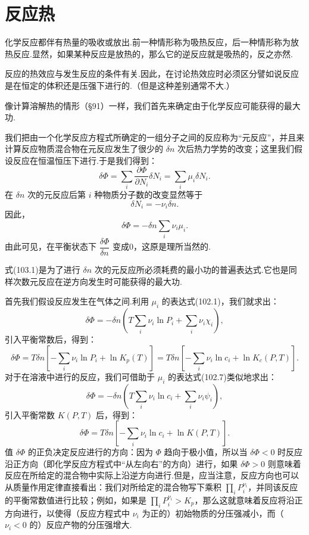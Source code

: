 \section{反应热}

化学反应都伴有热量的吸收或放出.前一种情形称为吸热反应，后一种情形称为放热反应.显然，如果某种反应是放热的，那么它的逆反应就是吸热的，反之亦然.

反应的热效应与发生反应的条件有关.因此，在讨论热效应时必须区分譬如说反应是在恒定的体积还是压强下进行的.（但是这种差别通常不大.）

像计算溶解热的情形（§91）一样，我们首先来确定由于化学反应可能获得的最大功.

我们把由一个化学反应方程式所确定的一组分子之间的反应称为“元反应”，并且来计算反应物质混合物在元反应发生了很少的 $\delta n$ 次后热力学势的改变；这里我们假设反应在恒温恒压下进行.于是我们得到：
\begin{equation*}
  \delta\Phi=\sum_i\frac{\partial\Phi}{\partial N_i}\delta N_i
  =\sum_i\mu_i\delta N_i.
\end{equation*}
在 $\delta n$ 次的元反应后第 $i$ 种物质分子数的改变显然等于
\begin{equation*}
  \delta N_i=-\nu_i\delta n.
\end{equation*}
因此，
\begin{equation}
  \delta\Phi=-\delta n\sum_i\nu_i\mu_i.
\end{equation}
由此可见，在平衡状态下 $\dfrac{\delta\Phi}{\delta n}$ 变成0，这原是理所当然的.

式(103.1)是为了进行 $\delta n$ 次的元反应所必须耗费的最小功的普遍表达式.它也是同样次数元反应在逆方向发生时可能获得的最大功.

首先我们假设反应发生在气体之间.利用 $\mu_i$ 的表达式(102.1)，我们就求出：
\begin{equation*}
  \delta\Phi=-\delta n\left(T\sum_i\nu_i\ln P_i
  +\sum_i\nu_i\chi_i\right),
\end{equation*}
引入平衡常数后，得到：
\begin{equation}
  \delta\Phi=T\delta n\left[-\sum_i\nu_i\ln P_i+\ln K_p(T)\right]
  =T\delta n\left[-\sum_i\nu_i\ln c_i+\ln K_c(P,T)\right].
\end{equation}
对于在溶液中进行的反应，我们可借助于 $\mu_i$ 的表达式(102.7)类似地求出：
\begin{equation*}
  \delta\Phi=-\delta n\left(T\sum_i\nu_i\ln c_i
  +\sum_i\nu_i\psi_i\right),
\end{equation*}
引入平衡常数 $K(P,T)$ 后，得到：
\begin{equation}
  \delta\Phi=T\delta n\left[-\sum_i\nu_i\ln c_i
  +\ln K(P,T)\right].
\end{equation}
值 $\delta\Phi$ 的正负决定反应进行的方向：因为 $\Phi$ 趋向于极小值，所以当 $\delta\Phi<0$ 时反应沿正方向（即化学反应方程式中“从左向右”的方向）进行，如果 $\delta\Phi>0$ 则意味着反应在所给定的混合物中实际上沿逆方向进行.但是，应当注意，反应方向也可以从质量作用定律直接看出：我们对所给定的混合物写下乘积 $\prod\limits_iP_i^{\nu_i}$，并同该反应的平衡常数值进行比较；例如，如果是 $\prod\limits_iP_i^{\nu_i}>K_p$，那么这就意味着反应将沿正方向进行，以使得（反应方程式中 $\nu_i$ 为正的）初始物质的分压强减小，而（$\nu_i<0$ 的）反应产物的分压强增大.

